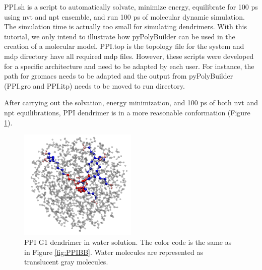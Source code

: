 PPI.sh is a script to automatically solvate, minimize energy, equilibrate for 100 ps using nvt and npt ensemble, and run 100 ps of molecular dynamic simulation.
The simulation time is actually too small for simulating dendrimers. With this tutorial, we only intend to illustrate how pyPolyBuilder can be used in the creation of a molecular model.
PPI.top is the topology file for the system and mdp directory have all required mdp files.
However, these scripts were developed for a specific architecture and need to be adapted by each user.
For instance, the path for gromacs needs to be adapted and the output from pyPolyBuilder (PPI.gro and PPI.itp) needs to be moved to run directory.

After carrying out the solvation, energy minimization, and 100 ps of both nvt and npt equilibrations, PPI dendrimer is in a more reasonable conformation (Figure \ref{fig:PPIG1SOL}).

\begin{figure}
    \centering
    \includegraphics[width=0.5\textwidth]{PPI/PPISOL.pdf}
    \caption{PPI G1 dendrimer in water solution.
             The color code is the same as in Figure \ref{fig:PPIBB}.
             Water molecules are represented as translucent gray molecules.}
    \label{fig:PPIG1SOL}
\end{figure}